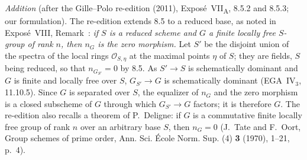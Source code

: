 \par\medskip\noindent
\emph{Addition} (after the Gille--Polo re-edition (2011),
Expos\'e~VII\textsubscript{A}, 8.5.2 and 8.5.3; our formulation). The
re-edition extends 8.5 to a reduced base, as noted in Expos\'e~VIII,
Remark~: \emph{if \(S\) is a reduced scheme and \(G\) a finite
locally free \(S\)-group of rank \(n\), then \(n_G\) is the zero
morphism.} Let \(S'\) be the disjoint union of the spectra of the local
rings \(\mathcal O_{S,\eta}\) at the maximal points \(\eta\) of \(S\); they
are fields, \(S\) being reduced, so that \(n_{G_{S'}}=0\) by 8.5. As
\(S'\to S\) is schematically dominant and \(G\) is finite and locally free
over \(S\), \(G_{S'}\to G\) is schematically dominant (EGA~IV\(_3\),
11.10.5). Since \(G\) is separated over \(S\), the equalizer of \(n_G\)
and the zero morphism is a closed subscheme of \(G\) through which
\(G_{S'}\to G\) factors; it is therefore \(G\). The re-edition also recalls
a theorem of P.~Deligne: if \(G\) is a commutative finite locally free
group of rank \(n\) over an arbitrary base \(S\), then \(n_G=0\)
(J.~Tate and F.~Oort, Group schemes of prime order, Ann. Sci. \'Ecole
Norm. Sup. (4) \textbf{3} (1970), 1--21, p.~4).

